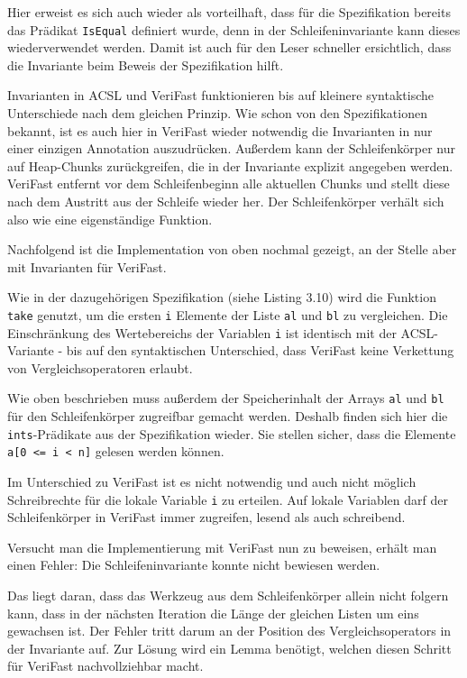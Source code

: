 Hier erweist es sich auch wieder als vorteilhaft, dass für die Spezifikation bereits das Prädikat
\lstinline{IsEqual} definiert wurde, denn in der Schleifeninvariante kann dieses wiederverwendet werden. Damit
ist auch für den Leser schneller ersichtlich, dass die Invariante beim Beweis der Spezifikation hilft.

Invarianten in ACSL und VeriFast funktionieren bis auf kleinere syntaktische Unterschiede nach dem gleichen Prinzip.
Wie schon von den Spezifikationen bekannt, ist es auch hier in VeriFast wieder notwendig die Invarianten in nur
einer einzigen Annotation auszudrücken. Außerdem kann der Schleifenkörper nur auf Heap-Chunks zurückgreifen, die
in der Invariante explizit angegeben werden. VeriFast entfernt vor dem Schleifenbeginn alle aktuellen Chunks
und stellt diese nach dem Austritt aus der Schleife wieder her. Der Schleifenkörper verhält sich also
wie eine eigenständige Funktion.

\pagebreak
Nachfolgend ist die Implementation von oben nochmal gezeigt, an der Stelle aber mit Invarianten für VeriFast.



Wie in der dazugehörigen Spezifikation (siehe Listing 3.10) wird die Funktion \lstinline{take} genutzt,
um die ersten \lstinline{i} Elemente der Liste \lstinline{al} und \lstinline{bl} zu vergleichen.
Die Einschränkung des Wertebereichs der Variablen \lstinline{i} ist identisch mit der ACSL-Variante -
bis auf den syntaktischen Unterschied, dass VeriFast keine Verkettung von Vergleichsoperatoren erlaubt.

Wie oben beschrieben muss außerdem der Speicherinhalt der Arrays \lstinline{al} und \lstinline{bl} für
den Schleifenkörper zugreifbar gemacht werden. Deshalb finden sich hier die \lstinline{ints}-Prädikate
aus der Spezifikation wieder. Sie stellen sicher, dass die Elemente \lstinline{a[0 <= i < n]} gelesen
werden können.

Im Unterschied zu VeriFast ist es nicht notwendig und auch nicht möglich Schreibrechte für die lokale Variable 
\lstinline{i} zu erteilen. Auf lokale Variablen darf der Schleifenkörper in VeriFast immer zugreifen, lesend
als auch schreibend.

Versucht man die Implementierung mit VeriFast nun zu beweisen, erhält man einen Fehler: Die Schleifeninvariante
konnte nicht bewiesen werden.

Das liegt daran, dass das Werkzeug aus dem Schleifenkörper allein nicht folgern kann, dass in der nächsten Iteration 
die Länge der gleichen Listen um eins gewachsen ist. Der Fehler tritt darum an der Position des Vergleichsoperators in
der Invariante auf. Zur Lösung wird ein Lemma benötigt, welchen diesen Schritt für VeriFast nachvollziehbar macht.



